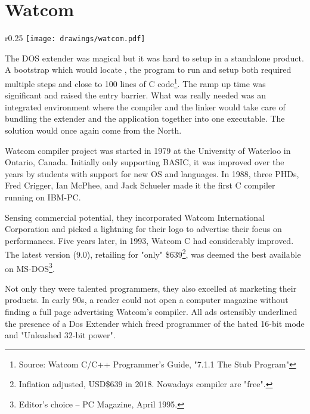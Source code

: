\section{Watcom}

\begin{wrapfigure}[9]{r}{0.25\textwidth}
\centering
\texttt{[image: drawings/watcom.pdf]}
\end{wrapfigure}


The DOS extender was magical but it was hard to setup in a standalone product. A bootstrap which would locate , the program to run and setup both required multiple steps and close to 100 lines of C code\footnote{Source: Watcom C/C++ Programmer's Guide, "7.1.1 The Stub Program"}. The ramp up time was significant and raised the entry barrier. What was really needed was an integrated environment where the compiler and the linker would take care of bundling the extender and the application together into one executable. The solution would once again come from the North.\\ 
\par

Watcom compiler project was started in 1979 at the University of Waterloo in Ontario, Canada. Initially only supporting BASIC, it was improved over the years by students with support for new OS and languages. In 1988, three PHDs, Fred Crigger, Ian McPhee, and Jack Schueler made it the first C compiler running on IBM-PC.\\
\par
Sensing commercial potential, they incorporated Watcom International Corporation and picked a lightning for their logo to advertise their focus on performances. Five years later, in 1993, Watcom C had considerably improved. The latest version (9.0), retailing for "only" \$639\footnote{Inflation adjusted, USD\$639 in 2018. Nowadays compiler are "free".},  was deemed the best available on MS-DOS\footnote{Editor's choice -- PC Magazine, April 1995.}. \\
\par
Not only they were talented programmers, they also excelled at marketing their products. In early 90s, a reader could not open a computer magazine without finding a full page advertising Watcom's compiler. All ads ostensibly underlined the presence of a Dos Extender which freed programmer of the hated 16-bit mode and "Unleashed 32-bit power".
\par
\label{watcomad}



